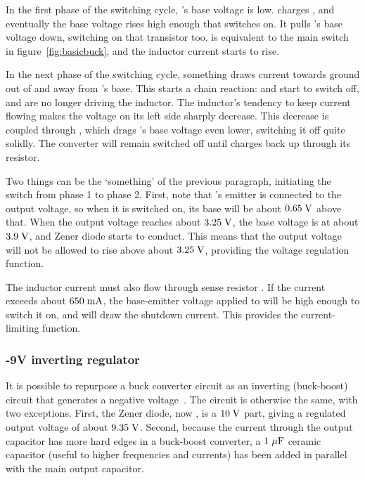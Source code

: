 In the first phase of the switching cycle, 's base voltage is
low.  charges , and eventually the base voltage rises
high enough that  switches on. It pulls 's base voltage
down, switching on that transistor too.  is equivalent to the main
switch in figure~\ref{fig:basicbuck}, and the inductor current starts to rise.

In the next phase of the switching cycle, something draws current towards ground
out of  and away from 's base. This starts a chain reaction:
 and  start to switch off, and are no longer driving the
inductor. The inductor's tendency to keep current flowing makes the voltage on its
left side sharply decrease. This decrease is coupled through , which
drags 's base voltage even lower, switching it off quite solidly.
The converter will remain switched off until  charges back up through
its resistor.

Two things can be the `something' of the previous paragraph, initiating the
switch from phase 1 to phase 2. First, note that 's emitter is
connected to the output voltage, so when it is switched on, its base will be
about $0.65\;\mathrm{V}$ above that. When the output voltage reaches about
$3.25\;\mathrm{V}$, the base voltage is at about $3.9\;\mathrm{V}$, and Zener diode
 starts to conduct. This means that the output voltage will not be
allowed to rise above about $3.25\;\mathrm{V}$, providing the voltage regulation
function.

The inductor current must also flow through sense resistor . If the
current exceeds about $650\;\mathrm{mA}$, the base-emitter voltage applied to
 will be high enough to switch it on, and  will draw the
shutdown current. This provides the current-limiting function.

\subsubsection{-9V inverting regulator}
It is possible to repurpose a buck converter circuit as an inverting
(buck-boost) circuit that generates a negative voltage~\cite{buckinv}. The
circuit is otherwise the same, with two exceptions. First, the Zener diode, now
, is a $10\;\mathrm{V}$ part, giving a regulated output voltage of
about $9.35\;\mathrm{V}$. Second, because the current through the output capacitor
has more hard edges in a buck-boost converter, a $1\;\mathrm{\mu F}$ ceramic
capacitor (useful to higher frequencies and currents) has been added in
parallel with the main output capacitor.

